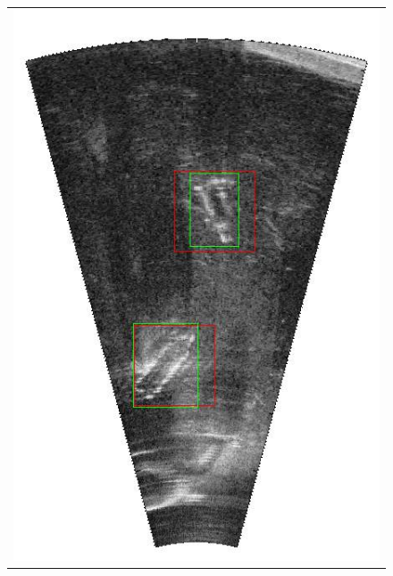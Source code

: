 \begin{figure}[p]
{\begin{tabular}[b]{c}
		\includegraphics[height=0.22\textheight]{chapters/images/proposals/detections/nms070-2016-02-11_035335-frame11602-proposals.jpg}\\

\end{tabular}}
\end{figure}
